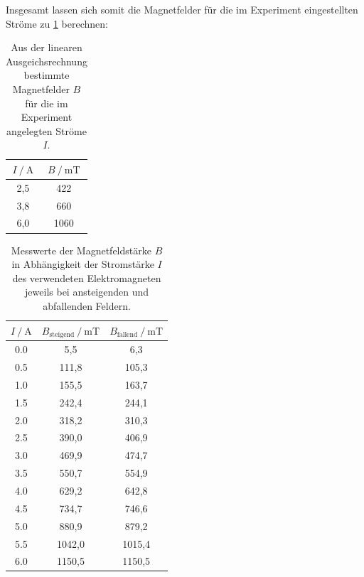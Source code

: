 Insgesamt lassen sich somit die Magnetfelder für die im Experiment eingestellten Ströme zu \ref{tab:Bfelder} berechnen:
\begin{table}[H]
  \centering
  \caption{Aus der linearen Ausgeichsrechnung bestimmte Magnetfelder $B$ für die im Experiment angelegten Ströme $I$.}
  \label{tab:Bfelder}
  \begin{tabular}{cc}
    \toprule
    {$I \:/\: \si{\ampere}$} & {$B \:/\: \si{\milli\tesla}$}\\
    \midrule
  2,5 & 422 \pm 34 \\
  3,8 & 660 \pm 40 \\
  6,0 & 1060 \pm 50
  \end{tabular}
\end{table}
\clearpage
\begin{table}[H]
  \centering
  \caption{Messwerte der Magnetfeldstärke $B$ in Abhängigkeit der Stromstärke $I$ des verwendeten Elektromagneten jeweils bei ansteigenden und abfallenden Feldern.}
  \label{tab:eichen}
  \begin{tabular}{c|cc}
    \toprule
    {$I \:/\: \si{\ampere}$} & {$B_\text{steigend} \:/\: \si{\milli\tesla}$} & {$B_\text{fallend} \:/\: \si{\milli\tesla}$} \\
    \midrule
  0.0    &     5,5  &    6,3  \\
  0.5    &    111,8  &   105,3  \\
  1.0    &   155,5  &  163,7  \\
  1.5    &   242,4  &  244,1  \\
  2.0    &   318,2  &  310,3  \\
  2.5    &   390,0  &  406,9  \\
  3.0    &   469,9  &  474,7  \\
  3.5    &   550,7  &  554,9  \\
  4.0    &   629,2  &  642,8  \\
  4.5    &   734,7  &  746,6  \\
  5.0    &   880,9  &  879,2  \\
  5.5    &   1042,0  &  1015,4  \\
  6.0    &   1150,5  &  1150,5  \\
  \end{tabular}
\end{table}

